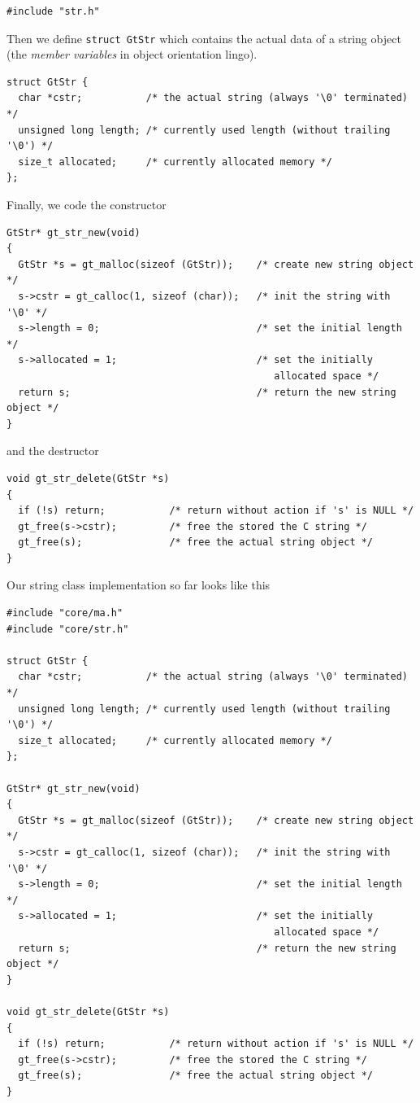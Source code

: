 \documentclass[11pt,final]{article}
\newcommand{\keyword}[1]{\lstinline{#1}}
\begin{document}
\begin{lstlisting}
#include "str.h"
\end{lstlisting}

Then we define \keyword{struct GtStr} which contains the actual data of a
string object (the \emph{member variables} in object orientation lingo).

\begin{lstlisting}
struct GtStr {
  char *cstr;           /* the actual string (always '\0' terminated) */
  unsigned long length; /* currently used length (without trailing '\0') */
  size_t allocated;     /* currently allocated memory */
};
\end{lstlisting}

Finally, we code the constructor

\begin{lstlisting}
GtStr* gt_str_new(void)
{
  GtStr *s = gt_malloc(sizeof (GtStr));    /* create new string object */
  s->cstr = gt_calloc(1, sizeof (char));   /* init the string with '\0' */
  s->length = 0;                           /* set the initial length */
  s->allocated = 1;                        /* set the initially
                                              allocated space */
  return s;                                /* return the new string object */
}
\end{lstlisting}

and the destructor

\begin{lstlisting}
void gt_str_delete(GtStr *s)
{
  if (!s) return;           /* return without action if 's' is NULL */
  gt_free(s->cstr);         /* free the stored the C string */
  gt_free(s);               /* free the actual string object */
}
\end{lstlisting}

Our string class implementation so far looks like this

\begin{lstlisting}
#include "core/ma.h"
#include "core/str.h"

struct GtStr {
  char *cstr;           /* the actual string (always '\0' terminated) */
  unsigned long length; /* currently used length (without trailing '\0') */
  size_t allocated;     /* currently allocated memory */
};

GtStr* gt_str_new(void)
{
  GtStr *s = gt_malloc(sizeof (GtStr));    /* create new string object */
  s->cstr = gt_calloc(1, sizeof (char));   /* init the string with '\0' */
  s->length = 0;                           /* set the initial length */
  s->allocated = 1;                        /* set the initially
                                              allocated space */
  return s;                                /* return the new string object */
}

void gt_str_delete(GtStr *s)
{
  if (!s) return;           /* return without action if 's' is NULL */
  gt_free(s->cstr);         /* free the stored the C string */
  gt_free(s);               /* free the actual string object */
}
\end{lstlisting}
\end{document}
